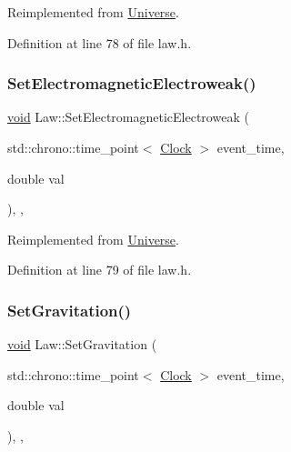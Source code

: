Reimplemented from \mbox{\hyperlink{class_universe_aa981fc7e252b1fbbb675f0371860954d}{Universe}}.



Definition at line 78 of file law.\+h.

\mbox{\label{class_law_aca9bb82839ddb46bd89f52b6211c5a54}} 
\subsubsection{\texorpdfstring{Set\+Electromagnetic\+Electroweak()}{SetElectromagneticElectroweak()}}
{\footnotesize\ttfamily \mbox{\hyperlink{glad_8h_a950fc91edb4504f62f1c577bf4727c29}{void}} Law\+::\+Set\+Electromagnetic\+Electroweak (\begin{DoxyParamCaption}\item[{std\+::chrono\+::time\+\_\+point$<$ \mbox{\hyperlink{universe_8h_a0ef8d951d1ca5ab3cfaf7ab4c7a6fd80}{Clock}} $>$}]{event\+\_\+time,  }\item[{double}]{val }\end{DoxyParamCaption})\hspace{0.3cm}{\ttfamily [inline]}, {\ttfamily [final]}, {\ttfamily [virtual]}}



Reimplemented from \mbox{\hyperlink{class_universe_a608aa95698380f791a0ffba45cc1bee3}{Universe}}.



Definition at line 79 of file law.\+h.

\mbox{\label{class_law_a908ccc2b0a561a7324a15393ec157219}} 
\subsubsection{\texorpdfstring{Set\+Gravitation()}{SetGravitation()}}
{\footnotesize\ttfamily \mbox{\hyperlink{glad_8h_a950fc91edb4504f62f1c577bf4727c29}{void}} Law\+::\+Set\+Gravitation (\begin{DoxyParamCaption}\item[{std\+::chrono\+::time\+\_\+point$<$ \mbox{\hyperlink{universe_8h_a0ef8d951d1ca5ab3cfaf7ab4c7a6fd80}{Clock}} $>$}]{event\+\_\+time,  }\item[{double}]{val }\end{DoxyParamCaption})\hspace{0.3cm}{\ttfamily [inline]}, {\ttfamily [final]}, {\ttfamily [virtual]}}



